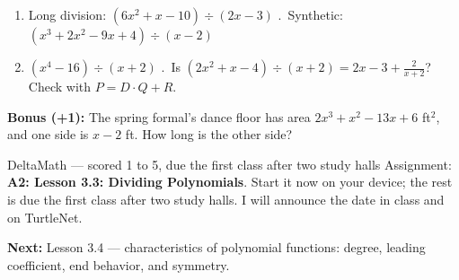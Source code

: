 \documentclass[aspectratio=169, 11pt]{beamer}
\begin{document}
\begin{frame}[t, plain]
  \small
  \begin{enumerate}\setlength{\itemsep}{2pt}
    \item Long division: $(6x^2 + x - 10) \div (2x - 3)$ \qquad{}.\ Synthetic: $(x^3 + 2x^2 - 9x + 4) \div (x - 2)$
    \setcounter{enumi}{2}
    \item $(x^4 - 16) \div (x + 2)$ \qquad{}.\ Is $(2x^2 + x - 4) \div (x + 2) = 2x - 3 + \frac{2}{x + 2}$? Check with
          $P = D\cdot Q + R$.
  \end{enumerate}
  \textbf{Bonus (+1):} The spring formal's dance floor has area $2x^3 + x^2 - 13x + 6$
  ft$^2$, and one side is $x - 2$ ft. How long is the other side?
  \vspace{2pt}
\end{frame}

\begin{frame}[t, plain]
  \begin{block}{DeltaMath --- scored 1 to 5, due the first class after two study halls}
    Assignment: \textbf{A2: Lesson 3.3: Dividing Polynomials}. Start it now on your device; the
    rest is due the first class after two study halls. I will announce the date in class and on
    TurtleNet.
  \end{block}
  \vspace{6pt}
  \textbf{Next:} Lesson 3.4 --- characteristics of polynomial functions: degree, leading
  coefficient, end behavior, and symmetry.
\end{frame}
\end{document}
